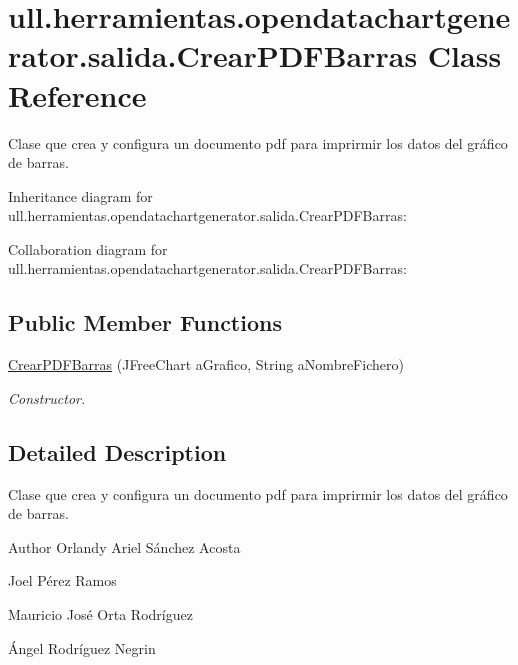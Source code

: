 \hypertarget{classull_1_1herramientas_1_1opendatachartgenerator_1_1salida_1_1_crear_p_d_f_barras}{}\section{ull.\+herramientas.\+opendatachartgenerator.\+salida.\+Crear\+P\+D\+F\+Barras Class Reference}
\label{classull_1_1herramientas_1_1opendatachartgenerator_1_1salida_1_1_crear_p_d_f_barras}


Clase que crea y configura un documento pdf para imprirmir los datos del gráfico de barras.  




Inheritance diagram for ull.\+herramientas.\+opendatachartgenerator.\+salida.\+Crear\+P\+D\+F\+Barras\+:


Collaboration diagram for ull.\+herramientas.\+opendatachartgenerator.\+salida.\+Crear\+P\+D\+F\+Barras\+:
\subsection*{Public Member Functions}
\begin{DoxyCompactItemize}
\item 
\mbox{\hyperlink{classull_1_1herramientas_1_1opendatachartgenerator_1_1salida_1_1_crear_p_d_f_barras_a141f2e6753a1cdd0d83f9e87b84676ae}{Crear\+P\+D\+F\+Barras}} (J\+Free\+Chart a\+Grafico, String a\+Nombre\+Fichero)
\begin{DoxyCompactList}\small\item\em Constructor. \end{DoxyCompactList}\end{DoxyCompactItemize}


\subsection{Detailed Description}
Clase que crea y configura un documento pdf para imprirmir los datos del gráfico de barras. 

\begin{DoxyAuthor}{Author}
Orlandy Ariel Sánchez Acosta 

Joel Pérez Ramos 

Mauricio José Orta Rodríguez 

Ángel Rodríguez Negrin 
\end{DoxyAuthor}


